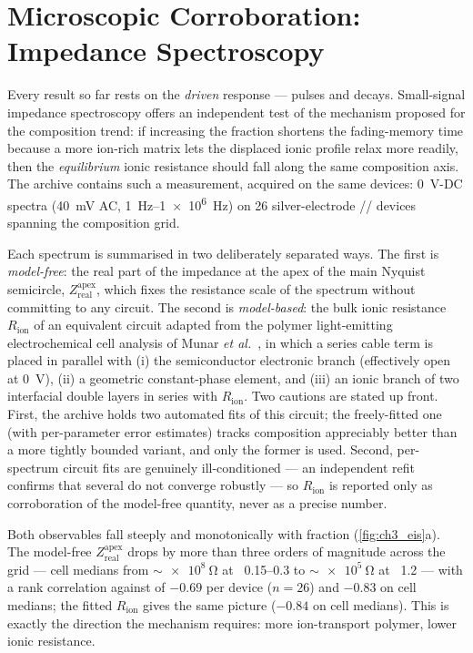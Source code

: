 \documentclass[12pt, twoside]{report}
\begin{document}
\section{Microscopic Corroboration: Impedance Spectroscopy}\label{sec:ch3_eis}

Every result so far rests on the \emph{driven} response --- pulses and decays. Small-signal impedance spectroscopy offers an independent test of the mechanism proposed for the composition trend: if increasing the \PEO{} fraction shortens the fading-memory time because a more ion-rich matrix lets the displaced ionic profile relax more readily, then the \emph{equilibrium} ionic resistance should fall along the same composition axis. The archive contains such a measurement, acquired on the same devices: \SI{0}{\volt}-DC spectra (\SI{40}{\milli\volt} AC, \SIrange{1}{1e6}{\hertz}) on \num{26} silver-electrode \SY{}/\PEO{}/\LiTf{} devices spanning the composition grid.

Each spectrum is summarised in two deliberately separated ways. The first is \emph{model-free}: the real part of the impedance at the apex of the main Nyquist semicircle, \(Z_{\mathrm{real}}^{\mathrm{apex}}\), which fixes the resistance scale of the spectrum without committing to any circuit. The second is \emph{model-based}: the bulk ionic resistance \(R_{\mathrm{ion}}\) of an equivalent circuit adapted from the polymer light-emitting electrochemical cell analysis of Munar \textit{et al.}~\cite{Munar2012}, in which a series cable term is placed in parallel with (i) the semiconductor electronic branch (effectively open at \SI{0}{\volt}), (ii) a geometric constant-phase element, and (iii) an ionic branch of two interfacial double layers in series with \(R_{\mathrm{ion}}\). Two cautions are stated up front. First, the archive holds two automated fits of this circuit; the freely-fitted one (with per-parameter error estimates) tracks composition appreciably better than a more tightly bounded variant, and only the former is used. Second, per-spectrum circuit fits are genuinely ill-conditioned --- an independent refit confirms that several do not converge robustly --- so \(R_{\mathrm{ion}}\) is reported only as corroboration of the model-free quantity, never as a precise number.

Both observables fall steeply and monotonically with \PEO{} fraction (\cref{fig:ch3_eis}a). The model-free \(Z_{\mathrm{real}}^{\mathrm{apex}}\) drops by more than three orders of magnitude across the grid --- cell medians from \(\sim\!\SI{e8}{\ohm}\) at \PEO{}~\numrange{0.15}{0.3} to \(\sim\!\SI{e5}{\ohm}\) at \PEO{}~\num{1.2} --- with a rank correlation against \PEO{} of \(-0.69\) per device (\(n=26\)) and \(-0.83\) on cell medians; the fitted \(R_{\mathrm{ion}}\) gives the same picture (\(-0.84\) on cell medians). This is exactly the direction the mechanism requires: more ion-transport polymer, lower ionic resistance.
\end{document}
